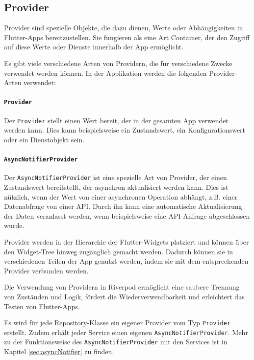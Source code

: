 \documentclass{entwurfsheft}
\begin{document}
\subsection{Provider}
Provider sind spezielle Objekte, die dazu dienen, Werte oder Abhängigkeiten in Flutter-Apps bereitzustellen. Sie fungieren als eine Art Container, der den Zugriff auf diese Werte oder Dienste innerhalb der App ermöglicht.

Es gibt viele verschiedene Arten von Providern, die für verschiedene Zwecke verwendet werden können. In der Applikation werden die folgenden Provider-Arten verwendet:

\paragraph{\texttt{Provider}}
Der \texttt{Provider} stellt einen Wert bereit, der in der gesamten App verwendet werden kann. Dies kann beispielsweise ein Zustandswert, ein Konfigurationswert oder ein Dienstobjekt sein.

\paragraph{\texttt{AsyncNotifierProvider}}
Der \texttt{AsyncNotifierProvider} ist eine spezielle Art von Provider, der einen Zustandswert bereitstellt, der asynchron aktualisiert werden kann. Dies ist nützlich, wenn der Wert von einer asynchronen Operation abhängt, z.B. einer Datenabfrage von einer API. Durch ihn kann eine automatische Aktualisierung der Daten veranlasst werden, wenn beispielsweise eine API-Anfrage abgeschlossen wurde.

Provider werden in der Hierarchie der Flutter-Widgets platziert und können über den Widget-Tree hinweg zugänglich gemacht werden. Dadurch können sie in verschiedenen Teilen der App genutzt werden, indem sie mit dem entsprechenden Provider verbunden werden.

Die Verwendung von Providern in Riverpod ermöglicht eine saubere Trennung von Zuständen und Logik, fördert die Wiederverwendbarkeit und erleichtert das Testen von Flutter-Apps.

Es wird für jede Repository-Klasse ein eigener Provider vom Typ \texttt{Provider} erstellt. Zudem erhält jeder Service einen eigenen \texttt{AsyncNotifierProvider}. Mehr zu der Funktionsweise des \texttt{AsyncNotifierProvider} mit den Services ist in Kapitel \ref{sec:asyncNotifier} zu finden.

\newpage
\end{document}
